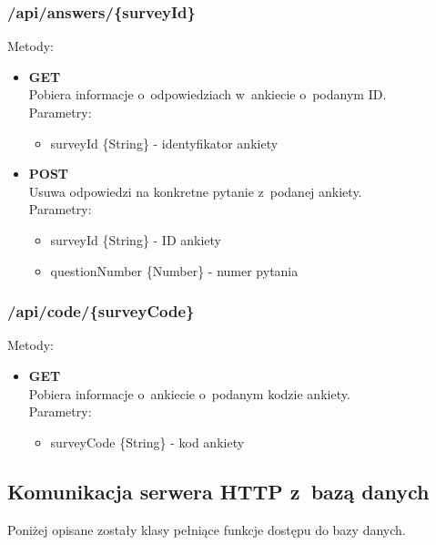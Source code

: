 \documentclass[8pt,a4paper,notitlepage]{article}
\begin{document}
\subsubsection{/api/answers/\{surveyId\}}
Metody:
\begin{itemize}
\item \textbf{GET} \\ Pobiera informacje o~odpowiedziach w~ankiecie o~podanym ID. \\ Parametry:
	\begin{itemize}
	\item surveyId \{String\} - identyfikator ankiety
	\end{itemize}
\item \textbf{POST} \\ Usuwa odpowiedzi na konkretne pytanie z~podanej ankiety. \\ Parametry:
	\begin{itemize}
	\item surveyId \{String\} - ID ankiety
	\item questionNumber \{Number\} - numer pytania
	\end{itemize}

\end{itemize}

\subsubsection{/api/code/\{surveyCode\}}
Metody:
\begin{itemize}
\item \textbf{GET} \\ Pobiera informacje o~ankiecie o~podanym kodzie ankiety. \\ Parametry:
	\begin{itemize}
	\item surveyCode \{String\} - kod ankiety
	\end{itemize}

\end{itemize}
\newpage
\subsection{Komunikacja serwera HTTP z~bazą danych}
Poniżej opisane zostały klasy pełniące funkcje dostępu do bazy danych.
\end{document}
